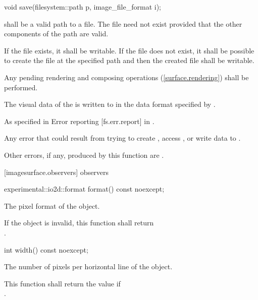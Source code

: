 \begin{itemdecl}
void save(filesystem::path p, image_file_format i);
\end{itemdecl}
\begin{itemdescr}
\pnum
\preconditions
{} shall be a valid path to a file. The file need not exist provided that the other components of the path are valid.

\pnum
If the file exists, it shall be writable. If the file does not exist, it shall be possible to create the file at the specified path and then the created file shall be writable.

\pnum
\effects
Any pending rendering and composing operations (\ref{surface.rendering}) shall be performed.

\pnum
The visual data of the \underlyingimagesurface is written to  in the data format specified by .

\pnum
\throws
As specified in Error reporting [fs.err.report] in \cppseventeen.

\pnum
\errors
Any error that could result from trying to create , access , or write data to .

\pnum
Other errors, if any, produced by this function are .
\end{itemdescr}

 [imagesurface.observers] { observers}

\begin{itemdecl}
experimental::io2d::format format() const noexcept;
\end{itemdecl}
\begin{itemdescr}
\pnum
\returns
The pixel format of the  object.

\pnum
\remarks
If the  object is invalid, this function shall return \\ .
\end{itemdescr}

\begin{itemdecl}
int width() const noexcept;
\end{itemdecl}
\begin{itemdescr}
\pnum
\returns
The number of pixels per horizontal line of the  object.

\pnum
\remarks
This function shall return the value  if \\
.
\end{itemdescr}

